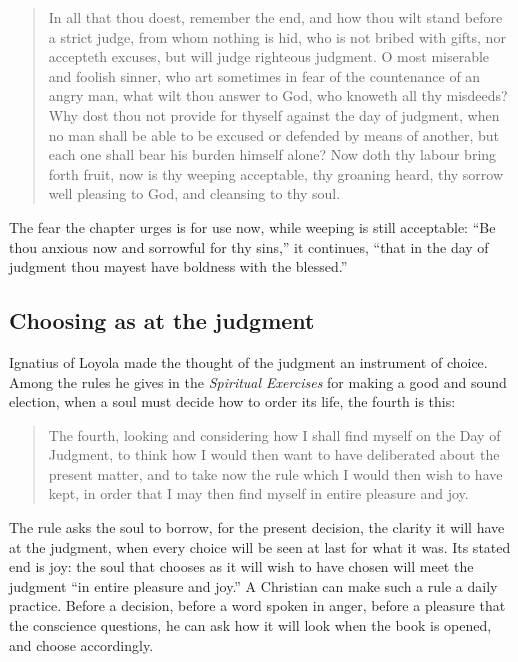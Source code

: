 \begin{quote}
In all that thou doest, remember the end, and how thou wilt stand before a strict judge, from whom nothing is hid, who is not bribed with gifts, nor accepteth excuses, but will judge righteous judgment. O most miserable and foolish sinner, who art sometimes in fear of the countenance of an angry man, what wilt thou answer to God, who knoweth all thy misdeeds? Why dost thou not provide for thyself against the day of judgment, when no man shall be able to be excused or defended by means of another, but each one shall bear his burden himself alone? Now doth thy labour bring forth fruit, now is thy weeping acceptable, thy groaning heard, thy sorrow well pleasing to God, and cleansing to thy soul.
\end{quote}

The fear the chapter urges is for use now, while weeping is still acceptable: ``Be thou anxious now and sorrowful for thy sins,'' it continues, ``that in the day of judgment thou mayest have boldness with the blessed.''

\subsection{Choosing as at the judgment}

Ignatius of Loyola made the thought of the judgment an instrument of choice. Among the rules he gives in the \emph{Spiritual Exercises} for making a good and sound election, when a soul must decide how to order its life, the fourth is this:

\begin{quote}
The fourth, looking and considering how I shall find myself on the Day of Judgment, to think how I would then want to have deliberated about the present matter, and to take now the rule which I would then wish to have kept, in order that I may then find myself in entire pleasure and joy.
\end{quote}

The rule asks the soul to borrow, for the present decision, the clarity it will have at the judgment, when every choice will be seen at last for what it was. Its stated end is joy: the soul that chooses as it will wish to have chosen will meet the judgment ``in entire pleasure and joy.'' A Christian can make such a rule a daily practice. Before a decision, before a word spoken in anger, before a pleasure that the conscience questions, he can ask how it will look when the book is opened, and choose accordingly.

